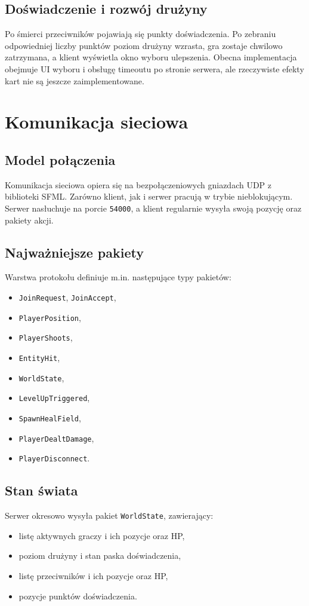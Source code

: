 \documentclass[a4paper,12pt]{article}
\begin{document}
\subsection{Doświadczenie i rozwój drużyny}
Po śmierci przeciwników pojawiają się punkty doświadczenia. Po zebraniu odpowiedniej liczby punktów poziom drużyny wzrasta, gra zostaje chwilowo zatrzymana, a klient wyświetla okno wyboru ulepszenia. Obecna implementacja obejmuje UI wyboru i obsługę timeoutu po stronie serwera, ale rzeczywiste efekty kart nie są jeszcze zaimplementowane.

\section{Komunikacja sieciowa}
\subsection{Model połączenia}
Komunikacja sieciowa opiera się na bezpołączeniowych gniazdach UDP z biblioteki SFML. Zarówno klient, jak i serwer pracują w trybie nieblokującym. Serwer nasłuchuje na porcie \texttt{54000}, a klient regularnie wysyła swoją pozycję oraz pakiety akcji.

\subsection{Najważniejsze pakiety}
Warstwa protokołu definiuje m.in. następujące typy pakietów:
\begin{itemize}[leftmargin=1.5cm]
    \item \texttt{JoinRequest}, \texttt{JoinAccept},
    \item \texttt{PlayerPosition},
    \item \texttt{PlayerShoots},
    \item \texttt{EntityHit},
    \item \texttt{WorldState},
    \item \texttt{LevelUpTriggered},
    \item \texttt{SpawnHealField},
    \item \texttt{PlayerDealtDamage},
    \item \texttt{PlayerDisconnect}.
\end{itemize}

\subsection{Stan świata}
Serwer okresowo wysyła pakiet \texttt{WorldState}, zawierający:
\begin{itemize}[leftmargin=1.5cm]
    \item listę aktywnych graczy i ich pozycje oraz HP,
    \item poziom drużyny i stan paska doświadczenia,
    \item listę przeciwników i ich pozycje oraz HP,
    \item pozycje punktów doświadczenia.
\end{itemize}
\end{document}
